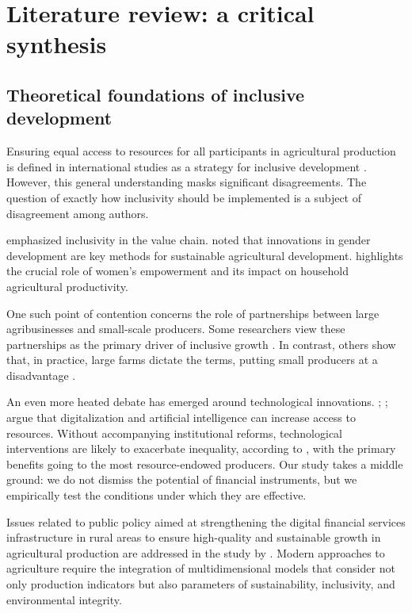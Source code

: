 ﻿\documentclass[pdflatex,sn-mathphys-ay]{sn-jnl}
\begin{document}
\section{Literature review: a critical synthesis}

\subsection{Theoretical foundations of inclusive development}

Ensuring equal access to resources for all participants in agricultural
production is defined in international studies as a strategy for
inclusive development \citep{ref29,ref44,ref77}. However, this general understanding masks
significant disagreements. The question of exactly how inclusivity
should be implemented is a subject of disagreement among authors.

\citet{ref81} emphasized inclusivity in the value chain.
\citet{ref24} noted that innovations in gender development are key
methods for sustainable agricultural development. \citet{ref27}
highlights the crucial role of women's empowerment and its impact on
household agricultural productivity.

One such point of contention concerns the role of partnerships between
large agribusinesses and small-scale producers. Some researchers view
these partnerships as the primary driver of inclusive growth
\citep{ref34,ref90}. In contrast, others show that, in practice, large farms dictate the terms, putting
small producers at a disadvantage \citep{ref90}.

An even more heated debate has emerged around technological innovations.
\citet{ref105}; \citet{ref72}; \citep{ref43,ref37,ref104} argue that digitalization and
artificial intelligence can increase access to resources. Without
accompanying institutional reforms, technological interventions are
likely to exacerbate inequality, according to \citet{ref28},
with the primary benefits going to the most resource-endowed producers.
Our study takes a middle ground: we do not dismiss the potential of
financial instruments, but we empirically test the conditions under
which they are effective.

Issues related to public policy aimed at strengthening the digital
financial services infrastructure in rural areas to ensure high-quality
and sustainable growth in agricultural production are addressed in the
study by \citet{ref38}. Modern approaches to agriculture
require the integration of multidimensional models that consider not only
production indicators but also parameters of
sustainability, inclusivity, and environmental integrity.
\end{document}
